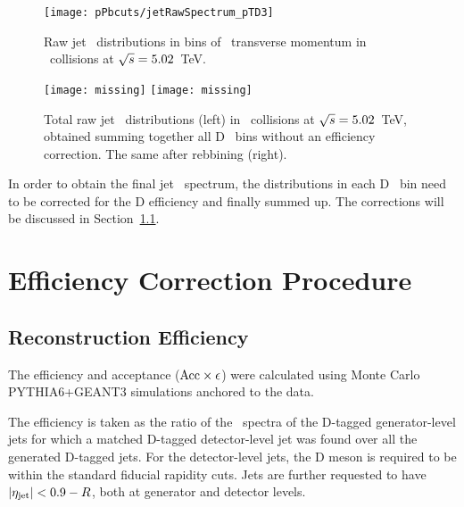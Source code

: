 \begin{figure}[bth]
\centering
\texttt{[image: pPbcuts/jetRawSpectrum\_pTD3]}
\caption{Raw jet \pt\ distributions in bins of \Dzero\ transverse momentum in \pp\ collisions at $\sqrt{s}=5.02$~TeV.}
\label{fig:eq_pPb_signBkgJet_Dzero_Dbins}
\end{figure}

\begin{figure}[bth]
\centering
	\texttt{[image: missing]}%
	\texttt{[image: missing]}%
\caption{Total raw jet \pt\ distributions (left) in \pp\ collisions at $\sqrt{s}=5.02$~TeV, obtained summing together all D \pt\ bins without an efficiency correction. The same after rebbining (right).}
\label{fig:eq_pPb_signBkgJet_tot}
\end{figure}

In order to obtain the final jet \pt\ spectrum, the distributions in each D \pt\ bin need to be corrected for the D efficiency and finally summed up.
The corrections will be discussed in Section~\ref{sect:sub_DmesonRecEff}. 



\section{Efficiency Correction Procedure}

\subsection{Reconstruction Efficiency}
\label{sect:sub_DmesonRecEff}
The efficiency and acceptance (${\rm Acc} \times \epsilon$) were calculated using Monte Carlo PYTHIA6+GEANT3 simulations anchored to the data.

The efficiency is taken as the ratio of the \ptd\ spectra of the D-tagged generator-level jets for which a matched
D-tagged detector-level jet was found over all the generated D-tagged jets.
For the detector-level jets, the D meson is required to be within the standard fiducial rapidity cuts.
Jets are further requested to have $|\eta_{\rm jet}| < 0.9 - R$, both at generator and detector levels.

